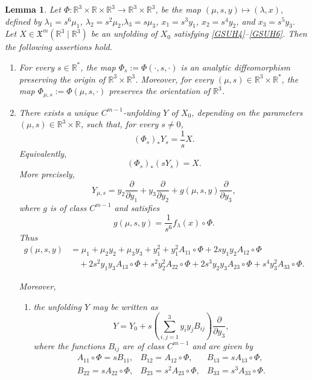 \documentclass[12pt]{article}
\newtheorem{lemma}[theorem]{Lemma}
\newtheorem{remark definition}{Remark Definition}[section]
\begin{document}
\begin{lemma}
	\label{GSUlem1}
	Let $\Phi:\mathbb{R}^3\times \mathbb{R}\times \mathbb{R}^3
	\longrightarrow
	\mathbb{R}^3\times \mathbb{R}^3$, 	be the map $(\mu,s,y)\longmapsto (\lambda,x),
	$
	defined by
	$\lambda_1=s^6\mu_1$,	$\lambda_2=s^2\mu_2$,$\lambda_3=s\mu_3$, 
	$x_1=s^3y_1$, $x_2=s^4y_2$, and $x_3=s^5y_3.$
	Let $X\in \mathfrak{X}^{m}(\mathbb{R}^{3}\mid \mathbb{R}^{3})$
	be an unfolding of $X_0$ satisfying \eqref{GSUH4}--\eqref{GSUH6}.
	Then the following assertions hold.
	
	\begin{enumerate}
		\item For every $s\in \mathbb{R}^{\ast}$, the map $\Phi_s:=\Phi(\cdot,s,\cdot)
		$
		is an analytic diffeomorphism preserving the origin of
		$\mathbb{R}^3\times \mathbb{R}^3$. Moreover, for every
		$(\mu,s)\in \mathbb{R}^3\times \mathbb{R}^{\ast}$, the map
		$\Phi_{\mu,s}:=\Phi(\mu,s,\cdot)$
		preserves the orientation of $\mathbb{R}^3$.
		
		\item There exists a unique $C^{m-1}$-unfolding $Y$ of $X_0$, depending on
		the parameters $(\mu,s)\in \mathbb{R}^3\times \mathbb{R}$, such that, for
		every $s\neq 0$,
		$$
		(\Phi_s)_*Y_s=\frac{1}{s}X.
		$$
		Equivalently,
		$$
		(\Phi_s)_*(sY_s)=X.
		$$
		More precisely,
		$$
		Y_{\mu,s}
		=
		y_2\frac{\partial}{\partial y_1}
		+
		y_3\frac{\partial}{\partial y_2}
		+
		g(\mu,s,y)\frac{\partial}{\partial y_3},
		$$
		where $g$ is of class $C^{m-1}$ and satisfies
		\begin{equation}
			\label{GSUg}
			g(\mu,s,y)
			=
			\frac{1}{s^6}f_{\lambda}(x)\circ \Phi.
		\end{equation}
		Thus
		\begin{align*}
			g(\mu,s,y)
			&=
			\mu_1+\mu_2y_2+\mu_3y_3+y_1^2
			+
			y_1^2 A_{11}\circ \Phi
			+
			2s y_1y_2 A_{12}\circ \Phi
			\\
			&\quad
			+
			2s^2 y_1y_3 A_{13}\circ \Phi
			+
			s^2 y_2^2 A_{22}\circ \Phi
			+
			2s^3 y_2y_3 A_{23}\circ \Phi
			+
			s^4 y_3^2 A_{33}\circ \Phi.
		\end{align*}
		
		Moreover,
		\begin{enumerate}
			\item the unfolding $Y$ may be written as
			$$
			Y
			=
			Y_0
			+
			s
			\left(
			\sum_{i,j=1}^{3}y_iy_jB_{ij}
			\right)
			\frac{\partial}{\partial y_3},
			$$
			where the functions $B_{ij}$ are of class $C^{m-1}$ and are given by
			\begin{equation}\label{Aij_Bij_GPU}
				\begin{array}{ccc}
A_{11}\circ \Phi = sB_{11},&B_{12} = A_{12}\circ \Phi,& B_{13} = sA_{13}\circ \Phi, \\
				B_{22} = sA_{22}\circ \Phi,&
				B_{23} = s^2A_{23}\circ \Phi,&
				B_{33} = s^3A_{33}\circ \Phi.
			\end{array}
			\end{equation}
			

\end{enumerate}
\end{enumerate}
\end{lemma}
\end{document}
